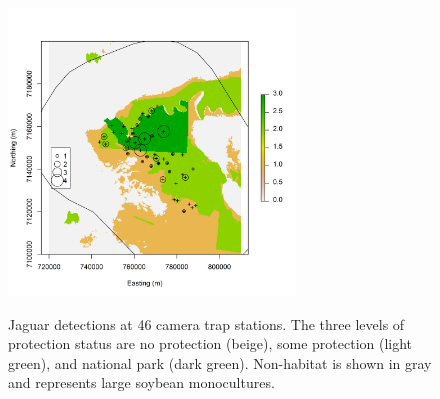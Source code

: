 \begin{figure}[ht]
\centering
\includegraphics[width=3in,height=3in]{Ch11/figs/jaguarCountMap}
\label{ch9.fig.jaguarCts}
\caption{Jaguar detections at 46 camera trap stations. The three levels of
  protection status are no protection (beige), some protection (light
  green), and national park (dark green). Non-habitat is shown in gray
  and represents large soybean monocultures. }
\end{figure}

